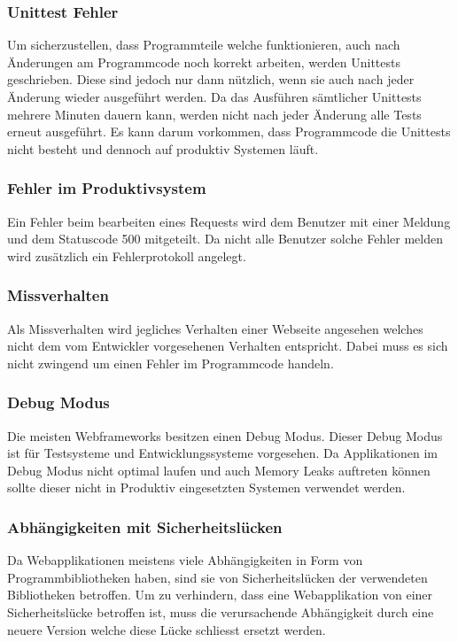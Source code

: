 \subsubsection{Unittest Fehler}
\label{ssub:unittestfehler}
Um sicherzustellen, dass Programmteile welche funktionieren, auch nach Änderungen am Programmcode noch korrekt arbeiten, werden Unittests geschrieben. Diese sind jedoch nur dann nützlich, wenn sie auch nach jeder Änderung wieder ausgeführt werden. Da das Ausführen sämtlicher Unittests mehrere Minuten dauern kann, werden nicht nach jeder Änderung alle Tests erneut ausgeführt. Es kann darum vorkommen, dass Programmcode die Unittests nicht besteht und dennoch auf produktiv Systemen läuft.

\subsubsection{Fehler im Produktivsystem}
\label{ssub:fehlerimproduktivsystem}
Ein Fehler beim bearbeiten eines Requests wird dem Benutzer mit einer Meldung und dem Statuscode 500 mitgeteilt. Da nicht alle Benutzer solche Fehler melden wird zusätzlich ein Fehlerprotokoll angelegt.

\subsubsection{Missverhalten}
\label{ssub:missverhalten}
Als Missverhalten wird jegliches Verhalten einer Webseite angesehen welches nicht dem vom Entwickler vorgesehenen Verhalten entspricht. Dabei muss es sich nicht zwingend um einen Fehler im Programmcode handeln.

\subsubsection{Debug Modus}
\label{ssub:debugmodus}
Die meisten Webframeworks besitzen einen Debug Modus. Dieser Debug Modus ist für Testsysteme und Entwicklungssysteme vorgesehen. Da Applikationen im Debug Modus nicht optimal laufen und auch Memory Leaks auftreten können sollte dieser nicht in Produktiv eingesetzten Systemen verwendet werden.

\subsubsection{Abhängigkeiten mit Sicherheitslücken}
\label{ssub:abhaengigkeitenmitsicherheitsluecken}
Da Webapplikationen meistens viele Abhängigkeiten in Form von Programmbibliotheken haben, sind sie von Sicherheitslücken der verwendeten Bibliotheken betroffen. Um zu verhindern, dass eine Webapplikation von einer Sicherheitslücke betroffen ist, muss die verursachende Abhängigkeit durch eine neuere Version welche diese Lücke schliesst ersetzt werden.


